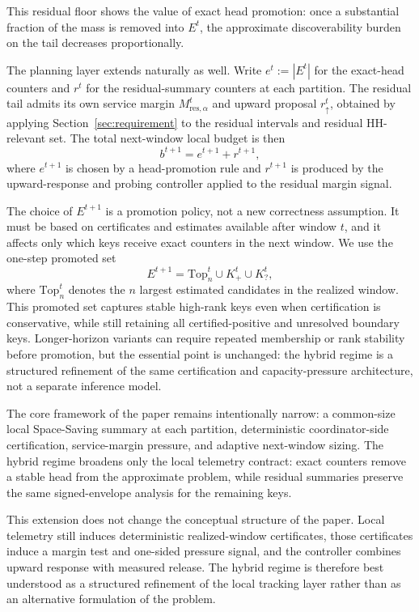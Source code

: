 \documentclass[sigconf, nonacm]{acmart}
\begin{document}
This residual floor shows the value of exact head promotion: once a substantial fraction of the mass is removed into \(E^t\), the approximate discoverability burden on the tail decreases proportionally.

The planning layer extends naturally as well. Write \(e^t := |E^t|\) for the exact-head counters and \(r^t\) for the residual-summary counters at each partition. The residual tail admits its own service margin \(M_{\mathrm{res},\alpha}^t\) and upward proposal \(r_\uparrow^t\), obtained by applying Section~\ref{sec:requirement} to the residual intervals and residual HH-relevant set. The total next-window local budget is then
\[
b^{t+1}
=
e^{t+1}
+
r^{t+1},
\]
where \(e^{t+1}\) is chosen by a head-promotion rule and \(r^{t+1}\) is produced by the upward-response and probing controller applied to the residual margin signal.

The choice of \(E^{t+1}\) is a promotion policy, not a new correctness assumption. It must be based on certificates and estimates available after window \(t\), and it affects only which keys receive exact counters in the next window. We use the one-step promoted set
\[
E^{t+1}=\mathrm{Top}_n^t\cup K_+^t\cup K_?^t,
\]
where \(\mathrm{Top}_n^t\) denotes the \(n\) largest estimated candidates in the realized window. This promoted set captures stable high-rank keys even when certification is conservative, while still retaining all certified-positive and unresolved boundary keys. Longer-horizon variants can require repeated membership or rank stability before promotion, but the essential point is unchanged: the hybrid regime is a structured refinement of the same certification and capacity-pressure architecture, not a separate inference model.

The core framework of the paper remains intentionally narrow: a common-size local Space-Saving summary at each partition, deterministic coordinator-side certification, service-margin pressure, and adaptive next-window sizing. The hybrid regime broadens only the local telemetry contract: exact counters remove a stable head from the approximate problem, while residual summaries preserve the same signed-envelope analysis for the remaining keys.

This extension does not change the conceptual structure of the paper. Local telemetry still induces deterministic realized-window certificates, those certificates induce a margin test and one-sided pressure signal, and the controller combines upward response with measured release. The hybrid regime is therefore best understood as a structured refinement of the local tracking layer rather than as an alternative formulation of the problem.
\end{document}
